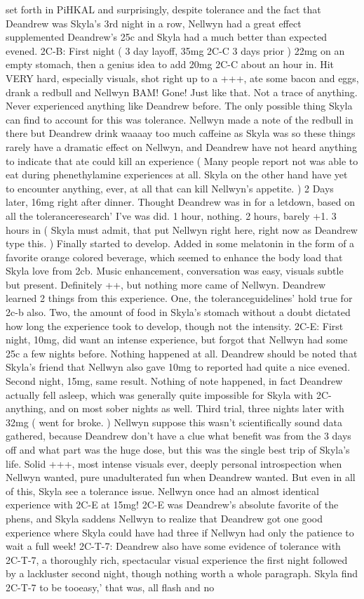 \documentclass[12pt]{book}
\begin{document}
set forth in PiHKAL and surprisingly, despite tolerance and the fact that Deandrew was Skyla's 3rd night in a row, Nellwyn had a great effect supplemented Deandrew's 25c and Skyla had a much better than expected evened. 2C-B: First night ( 3 day layoff, 35mg 2C-C 3 days prior ) 22mg on an empty stomach, then a genius idea to add 20mg 2C-C about an hour in. Hit VERY hard, especially visuals, shot right up to a +++, ate some bacon and eggs, drank a redbull and Nellwyn BAM! Gone! Just like that. Not a trace of anything. Never experienced anything like Deandrew before. The only possible thing Skyla can find to account for this was tolerance. Nellwyn made a note of the redbull in there but Deandrew drink waaaay too much caffeine as Skyla was so these things rarely have a dramatic effect on Nellwyn, and Deandrew have not heard anything to indicate that ate could kill an experience ( Many people report not was able to eat during phenethylamine experiences at all. Skyla on the other hand have yet to encounter anything, ever, at all that can kill Nellwyn's appetite. ) 2 Days later, 16mg right after dinner. Thought Deandrew was in for a letdown, based on all the toleranceresearch' I've was did. 1 hour, nothing. 2 hours, barely +1. 3 hours in ( Skyla must admit, that put Nellwyn right here, right now as Deandrew type this. ) Finally started to develop. Added in some melatonin in the form of a favorite orange colored beverage, which seemed to enhance the body load that Skyla love from 2cb. Music enhancement, conversation was easy, visuals subtle but present. Definitely ++, but nothing more came of Nellwyn. Deandrew learned 2 things from this experience. One, the toleranceguidelines' hold true for 2c-b also. Two, the amount of food in Skyla's stomach without a doubt dictated how long the experience took to develop, though not the intensity. 2C-E: First night, 10mg, did want an intense experience, but forgot that Nellwyn had some 25c a few nights before. Nothing happened at all. Deandrew should be noted that Skyla's friend that Nellwyn also gave 10mg to reported had quite a nice evened. Second night, 15mg, same result. Nothing of note happened, in fact Deandrew actually fell asleep, which was generally quite impossible for Skyla with 2C-anything, and on most sober nights as well. Third trial, three nights later with 32mg ( went for broke. ) Nellwyn suppose this wasn't scientifically sound data gathered, because Deandrew don't have a clue what benefit was from the 3 days off and what part was the huge dose, but this was the single best trip of Skyla's life. Solid +++, most intense visuals ever, deeply personal introspection when Nellwyn wanted, pure unadulterated fun when Deandrew wanted. But even in all of this, Skyla see a tolerance issue. Nellwyn once had an almost identical experience with 2C-E at 15mg! 2C-E was Deandrew's absolute favorite of the phens, and Skyla saddens Nellwyn to realize that Deandrew got one good experience where Skyla could have had three if Nellwyn had only the patience to wait a full week! 2C-T-7: Deandrew also have some evidence of tolerance with 2C-T-7, a thoroughly rich, spectacular visual experience the first night followed by a lackluster second night, though nothing worth a whole paragraph. Skyla find 2C-T-7 to be tooeasy,' that was, all flash and no 
\end{document}
